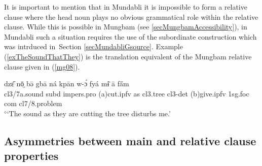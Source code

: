 \documentclass[10pt,twoside]{article}
\newcommand{\gl}[1]{`#1'}
\def\VSP{\vspace{0pt}}
\newcommand{\cl}[1]{{\sc cl#1}}
\newcommand{\pref}[1]{(\ref{#1})}
\newcommand{\sref}[1]{Section \ref{#1}}
\def\elicited{$^\diamond$}
\newcommand{\comment}[1]{\textcolor{blue}{\emph{#1}}}
\begin{document}
%
%
%

It is important to mention that in Mundabli it is impossible to form a relative clause 
where the head noun plays no obvious grammatical role within the relative clause.
While this is possible in Mungbam (see \ref{secMungbamAccessibility}), in Mundabli such a situation requires the use of the 
subordinate construction which was intrduced in~\sref{secMundabliGsource}. 
Example \pref{exTheSoundThatThey} is the 
translation equivalent of the Mungbam relative clause given in \pref{mg08}.

\begin{exe}
	\ex \label{exTheSoundThatThey}	
		\gll 	dzɛ̋ nō̤ bə̄ gbā ná kpān w-ɔ́ fyá mɨ̄ ā fa̋m	\\
			\cl3/7a.sound {\sc subd} {\sc impers.pro} ({\sc a})cut.{\sc ipfv} as \cl3.tree \cl3-{\sc det} ({\sc b})give.{\sc ipfv} {\sc 1sg.foc} {\sc com} \cl7/8.problem	\\
		\glt \VSP \elicited \gl{The sound as they are cutting the tree disturbs me.}
\end{exe}%

\subsection{Asymmetries between main and relative clause properties}\label{secMundabliTenseAspectFocus}


%
\end{document}
